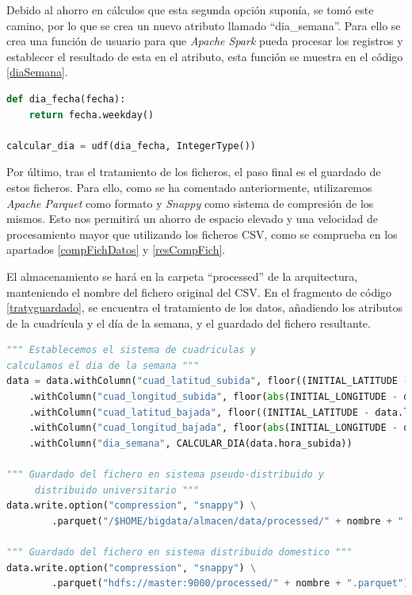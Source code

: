 Debido al ahorro en cálculos que esta segunda opción suponía, se tomó este camino, por lo que se crea un nuevo atributo llamado ``dia\_semana''. Para ello se crea una función de usuario para que \textit{Apache Spark} pueda procesar los registros y establecer el resultado de esta en el atributo, esta función se muestra en el código \ref{diaSemana}.

\begin{lstlisting}[label=diaSemana,language=Python,frame=single,caption=Función día de la semana para crear nuevo atributo]
def dia_fecha(fecha):
    return fecha.weekday()

calcular_dia = udf(dia_fecha, IntegerType())
\end{lstlisting}

Por último, tras el tratamiento de los ficheros, el paso final es el guardado de estos ficheros. Para ello, como se ha comentado anteriormente, utilizaremos \textit{Apache Parquet} como formato y \textit{Snappy} como sistema de compresión de los mismos. Esto nos permitirá un ahorro de espacio elevado y una velocidad de procesamiento mayor que utilizando los ficheros \gls{CSV}, como se comprueba en los apartados \ref{compFichDatos} y \ref{resCompFich}.

El almacenamiento se hará en la carpeta ``processed'' de la arquitectura, manteniendo el nombre del fichero original del \gls{CSV}. En el fragmento de código \ref{tratyguardado}, se encuentra el tratamiento de los datos, añadiendo los atributos de la cuadrícula y el día de la semana, y el guardado del fichero resultante.

\clearpage
\begin{lstlisting}[label=tratyguardado,language=Python,frame=single,caption=Código para el tratamiento y guardado del fichero procesado]
""" Establecemos el sistema de cuadriculas y 
calculamos el dia de la semana """
data = data.withColumn("cuad_latitud_subida", floor((INITIAL_LATITUDE - data.latitud_subida)/LATITUDE) + 1) \
    .withColumn("cuad_longitud_subida", floor(abs(INITIAL_LONGITUDE - data.longitud_subida)/LONGITUDE) + 1) \
    .withColumn("cuad_latitud_bajada", floor((INITIAL_LATITUDE - data.latitud_bajada)/LATITUDE) + 1) \
    .withColumn("cuad_longitud_bajada", floor(abs(INITIAL_LONGITUDE - data.longitud_bajada)/LONGITUDE) + 1) \
    .withColumn("dia_semana", CALCULAR_DIA(data.hora_subida))

""" Guardado del fichero en sistema pseudo-distribuido y
	 distribuido universitario """
data.write.option("compression", "snappy") \
        .parquet("/$HOME/bigdata/almacen/data/processed/" + nombre + ".parquet")

""" Guardado del fichero en sistema distribuido domestico """
data.write.option("compression", "snappy") \
        .parquet("hdfs://master:9000/processed/" + nombre + ".parquet")
\end{lstlisting}

